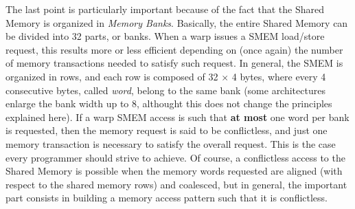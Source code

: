 \documentclass[12pt]{extarticle}
\begin{document}
The last point is particularly important because of the fact that the Shared Memory is organized in \emph{Memory Banks}. Basically, the entire Shared Memory can be divided into 32 parts, or banks. When a warp issues a SMEM load/store request, this results more or less efficient depending on (once again) the number of memory transactions needed to satisfy such request. In general, the SMEM is organized in rows, and each row is composed of 32 $\times$ 4 bytes, where every 4 consecutive bytes, called \emph{word}, belong to the same bank (some architectures enlarge the bank width up to 8, althought this does not change the principles explained here). If a warp SMEM access is such that \textbf{at most} one word per bank is requested, then the memory request is said to be conflictless, and just one memory transaction is necessary to satisfy the overall request. This is the case every programmer should strive to achieve. Of course, a conflictless access to the Shared Memory is possible when the memory words requested are aligned (with respect to the shared memory rows) and coalesced, but in general, the important part consists in building a memory access pattern such that it is conflictless.\newline
\end{document}
